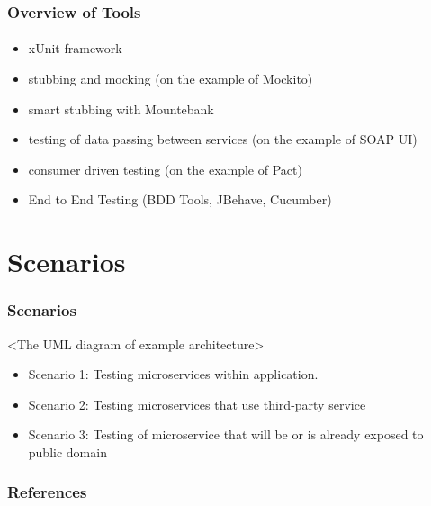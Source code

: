 \documentclass{beamer}
\begin{document}
\begin{frame}
	\frametitle{Overview of Tools}
	\framesubtitle{}
	\begin{itemize}
		\item xUnit framework
		\item stubbing and mocking (on the example of Mockito)
		\item smart stubbing with Mountebank
		\item testing of data passing between services (on the example of SOAP UI)
		\item consumer driven testing (on the example of Pact)
		\item End to End Testing (BDD Tools, JBehave, Cucumber)

	\end{itemize}
\end{frame}


\section{Scenarios}
\begin{frame}
	\frametitle{Scenarios}
	<The UML diagram of example architecture>
	\begin{itemize}
 		 \item Scenario 1: Testing microservices within application. 
		 \item Scenario 2: Testing microservices that use third-party service
		 \item Scenario 3: Testing of microservice that will be or is already exposed to public domain
	\end{itemize}
\end{frame}

\begin{frame}
	\frametitle{References}
	\framesubtitle{}


\end{frame}
\end{document}
